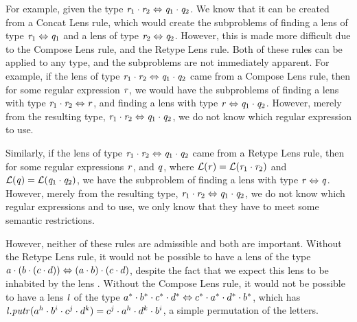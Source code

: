 For example, given the type $\mathit{r}_1\cdot\mathit{r}_2\Leftrightarrow\mathit{q}_1\cdot\mathit{q}_2$.
We know that it can be created from a Concat Lens rule,
which would create the subproblems of finding a lens of type $\mathit{r}_1\Leftrightarrow\mathit{q}_1$
and a lens of type $\mathit{r}_2\Leftrightarrow\mathit{q}_2$.
However, this is made more difficult due to the Compose Lens rule,
and the Retype Lens rule.
Both of these rules can be applied to any type, and the subproblems are not immediately apparent.
For example, if the lens of type
$\mathit{r}_1\cdot\mathit{r}_2\Leftrightarrow\mathit{q}_1\cdot\mathit{q}_2$
came from a Compose Lens rule, then for some regular expression $\mathit{r}$,
we would have the subproblems of finding a lens with type
$\mathit{r}_1\cdot\mathit{r}_2\Leftrightarrow\mathit{r}$,
and finding a lens with type
$\mathit{r}\Leftrightarrow\mathit{q}_1\cdot\mathit{q}_2$.
However, merely from the resulting type,
$\mathit{r}_1\cdot\mathit{r}_2 \Leftrightarrow \mathit{q}_1\cdot\mathit{q}_2$,
we do not know which regular expression \Regex{} to use.

Similarly, if the lens of type
$\mathit{r}_1\cdot\mathit{r}_2\Leftrightarrow\mathit{q}_1\cdot\mathit{q}_2$
came from a Retype Lens rule, then for some regular expressions $\mathit{r}$, and $\mathit{q}$,
where $\mathcal{L}{}(\mathit{r})=\mathcal{L}{}(\mathit{r}_1\cdot\mathit{r}_2)$
and $\mathcal{L}{}(\mathit{q})=\mathcal{L}{}(\mathit{q}_1\cdot\mathit{q}_2)$,
we have the subproblem of finding a lens with type
$\mathit{r}\Leftrightarrow\mathit{q}$.
However, merely from the resulting type,
$\mathit{r}_1\cdot\mathit{r}_2\Leftrightarrow\mathit{q}_1\cdot\mathit{q}_2$,
we do not know which regular expressions \Regex{} and \RegexAlt{} to
use, we only know that they have to meet some semantic restrictions.

However, neither of these rules are admissible and both are important.
Without the Retype Lens rule, it would not be possible to have a lens of the type
$a\cdot (b\cdot (c\cdot d))\Leftrightarrow(a\cdot b)\cdot(c\cdot d)$,
despite the fact that we expect this lens to be inhabited by the lens \IdentityLens{}.
Without the Compose Lens rule, it would not be possible to have a lens $\mathit{l}$ of the type
$a^*\cdot b^*\cdot c^*\cdot d^* \Leftrightarrow
c^*\cdot a^*\cdot d^*\cdot b^*$,
which has $\mathit{l}.\mathit{putr}(a^h\cdot b^i \cdot c^j \cdot d^k)=c^j\cdot a^h\cdot d^k\cdot b^i$, a simple permutation of the letters.

